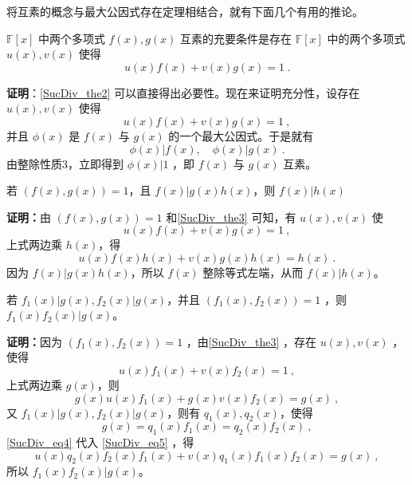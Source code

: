 将互素的概念与最大公因式存在定理相结合，就有下面几个有用的推论。
\begin{theorem}{}\label{SucDiv_the3}
$\mathbb{F}[x]$ 中两个多项式 $f(x),g(x)$ 互素的充要条件是存在 $\mathbb{F}[x]$ 中的两个多项式 $u(x),v(x)$ 使得
\begin{equation}
u(x)f(x)+v(x)g(x)=1~.
\end{equation}
\end{theorem}
\textbf{证明}：\autoref{SucDiv_the2} 可以直接得出必要性。现在来证明充分性，设存在 $u(x),v(x)$ 使得 
\begin{equation}
u(x)f(x)+v(x)g(x)=1~,
\end{equation}
并且 $\phi(x)$ 是 $f(x)$ 与 $g(x)$ 的一个最大公因式。于是就有
\begin{equation}
\phi(x)|f(x),\quad \phi(x)|g(x)~.
\end{equation}
由整除性质3，立即得到 $\phi(x)|1$ ，即 $f(x)$ 与 $g(x)$ 互素。
\begin{theorem}{}\label{SucDiv_the4}
若 $(f(x),g(x))=1$，且 $f(x)|g(x)h(x)$，则 $f(x)|h(x)$
\end{theorem}
\textbf{证明：}由 $(f(x),g(x))=1$ 和\autoref{SucDiv_the3} 可知，有 $u(x),v(x)$ 使
\begin{equation}
u(x)f(x)+v(x)g(x)=1~,
\end{equation}
上式两边乘 $h(x)$，得
\begin{equation}
u(x)f(x)h(x)+v(x)g(x)h(x)=h(x)~.
\end{equation}
因为 $f(x)|g(x)h(x)$，所以 $f(x)$ 整除等式左端，从而 $f(x)|h(x)$。
\begin{theorem}{}
若 $f_1(x)|g(x),f_2(x)|g(x)$，并且 $(f_1(x),f_2(x))=1$ ，则 $f_1(x)f_2(x)|g(x)$。
\end{theorem}
\textbf{证明：}因为 $(f_1(x),f_2(x))=1$ ，由\autoref{SucDiv_the3} ，存在 $u(x),v(x)$ ，使得
\begin{equation}
u(x)f_1(x)+v(x)f_2(x)=1~,
\end{equation}
上式两边乘 $g(x)$，则
\begin{equation}\label{SucDiv_eq5}
g(x)u(x)f_1(x)+g(x)v(x)f_2(x)=g(x)~,
\end{equation}
又 $f_1(x)|g(x),f_2(x)|g(x)$，则有 $q_1(x),q_2(x)$，使得
\begin{equation}\label{SucDiv_eq4}
g(x)=q_1(x)f_1(x)=q_2(x)f_2(x)~,
\end{equation}
\autoref{SucDiv_eq4} 代入 \autoref{SucDiv_eq5} ，得
\begin{equation}
u(x)q_2(x)f_2(x)f_1(x)+v(x)q_1(x)f_1(x)f_2(x)=g(x)~,
\end{equation}
所以 $f_1(x)f_2(x)|g(x)$。